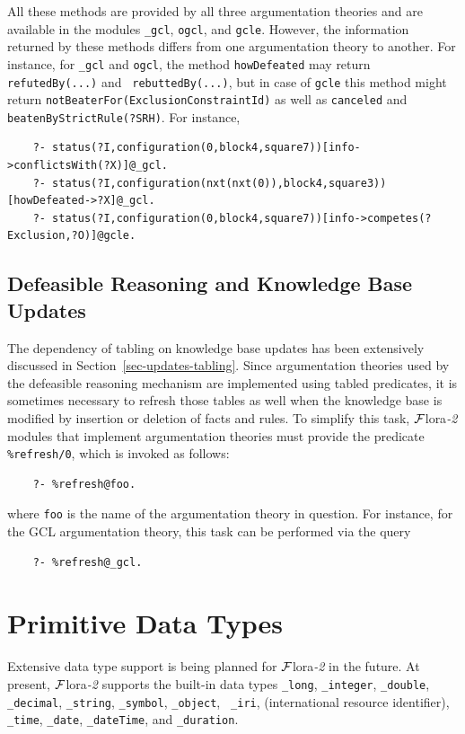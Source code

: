 \documentclass[11pt]{article}
\newcommand{\FLORA}{{\mbox{\sc ${\cal F}${lora}\rm\emph{-2}}}\xspace}
\begin{document}
All these methods are provided by all three argumentation theories and are
available in the modules {\tt \_gcl}, {\tt ogcl}, and {\tt gcle}. However,
the information returned by these methods differs from one argumentation theory
to another. For instance, for {\tt \_gcl} and {\tt ogcl}, the method
{\tt howDefeated} may return {\tt refutedBy(...)} and {\tt
  rebuttedBy(...)}, but in case of {\tt gcle} this method might return
{\tt notBeaterFor(ExclusionConstraintId)} as well as \texttt{canceled} and
\texttt{beatenByStrictRule(?SRH)}.    
For instance,
\begin{verbatim}
    ?- status(?I,configuration(0,block4,square7))[info->conflictsWith(?X)]@_gcl.
    ?- status(?I,configuration(nxt(nxt(0)),block4,square3))[howDefeated->?X]@_gcl.
    ?- status(?I,configuration(0,block4,square7))[info->competes(?Exclusion,?O)]@gcle.
\end{verbatim}

\subsection{Defeasible Reasoning and Knowledge Base Updates}

The dependency of tabling on knowledge base updates has been extensively
discussed in Section~\ref{sec-updates-tabling}.
Since argumentation theories used by the defeasible reasoning mechanism
are implemented using tabled
predicates, it is sometimes necessary to refresh those tables as well when
the knowledge base is modified by insertion or deletion of facts and rules.
To simplify this task, \FLORA modules that implement argumentation
theories must provide the predicate {\tt \%refresh/0}, which is invoked as
follows:
\begin{verbatim}
    ?- %refresh@foo.
\end{verbatim}
where {\tt foo} is the name of the argumentation theory in question. For
instance, for the GCL argumentation theory, this task can be performed via the
query
\begin{verbatim}
    ?- %refresh@_gcl.
\end{verbatim}


\section{Primitive Data Types}\label{sec-data-types}

Extensive data type support is being planned for \FLORA in the future.
At present, \FLORA supports the built-in data types
{\tt \_long}, \texttt{\_integer},
{\tt \_double},  \texttt{\_decimal},
\texttt{\_string}, {\tt \_symbol}, {\tt \_object}, {\tt
  \_iri}, (international resource identifier), {\tt \_time}, {\tt \_date},
{\tt \_dateTime}, and {\tt \_duration}.
\end{document}
